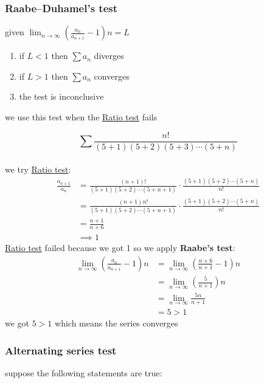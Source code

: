 \documentclass[a4paper,12pt]{article}
\newcommand{\?}{\stackrel{?}{=}}
\begin{document}
\subsubsection{Raabe–Duhamel's test}
\label{sec:orgd8424da}
\begin{definition}
given \(\lim_{n\to\infty} \left(\frac{a_n}{a_{n+1}}-1\right)n = L\)\\[0pt]
\begin{enumerate}
\item if \(L < 1\) then \(\sum a_n\) diverges\\[0pt]
\item if \(L > 1\) then \(\sum a_n\) converges\\[0pt]
\item the test is inconclusive\\[0pt]
\end{enumerate}
we use this test when the \hyperref[sec:orgcc05a6d]{Ratio test} fails\\[0pt]

\begin{my_example}
\[
  \sum \frac{n!}{(5+1)(5+2)(5+3) \cdots (5+n)}
\]\\[0pt]
we try \hyperref[sec:orgcc05a6d]{Ratio test}:\\[0pt]
\begin{align*}
  \frac{a_{n+1}}{a_n} &= \frac{(n+1)!}{(5+1)(5+2) \cdots (5+n+1)} \cdot \frac{(5+1)(5+2) \cdots (5+n)}{n!}\\
  &= \frac{(n+1)n!}{(5+1)(5+2) \cdots (5+n+1)} \cdot \frac{(5+1)(5+2) \cdots (5+n)}{n!}\\
  &= \frac{n+1}{n+6}\\
  &\implies 1
\end{align*}
\hyperref[sec:orgcc05a6d]{Ratio test} failed because we got 1 so we apply \textbf{Raabe's test}:\\[0pt]
\begin{align*}
  \lim_{n\to\infty} \left(\frac{a_n}{a_{n+1}}-1\right)n &= \lim_{n\to\infty} \left(\frac{n+6}{n+1}-1\right)n\\
  &= \lim_{n\to\infty} \left(\frac{5}{n+1}\right)n\\
  &= \lim_{n\to\infty} \frac{5n}{n+1}\\
  &= 5 > 1
\end{align*}
we got \(5 > 1\) which means the series converges\\[0pt]
\end{my_example}
\end{definition}
\subsubsection{Alternating series test}
\label{sec:orgcbff953}
suppose the following statements are true:\\[0pt]
\end{document}
